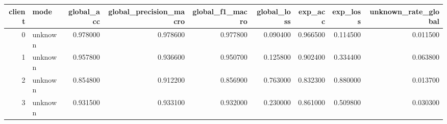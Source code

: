 \begin{tabular}{rlrrrrrrr}
\toprule
client & mode & global_acc & global_precision_macro & global_f1_macro & global_loss & exp_acc & exp_loss & unknown_rate_global \\
\midrule
0 & unknown & 0.978000 & 0.978600 & 0.977800 & 0.090400 & 0.966500 & 0.114500 & 0.011500 \\
1 & unknown & 0.957800 & 0.936600 & 0.950700 & 0.125800 & 0.902400 & 0.334400 & 0.063800 \\
2 & unknown & 0.854800 & 0.912200 & 0.856900 & 0.763000 & 0.832300 & 0.880000 & 0.013700 \\
3 & unknown & 0.931500 & 0.933100 & 0.932000 & 0.230000 & 0.861000 & 0.509800 & 0.030300 \\
\bottomrule
\end{tabular}
